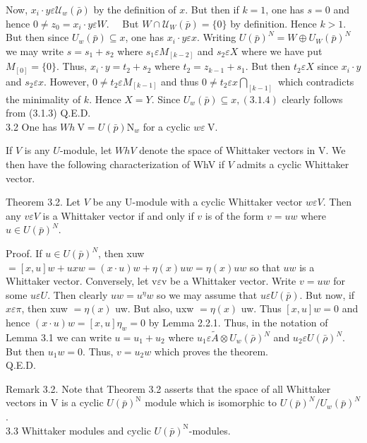 \documentclass[10pt]{article}
\begin{document}
Now, $x_{i} \cdot y \varepsilon \mathcal{U}_{w}(\bar{\rho})$ by the definition of $x$. But then if $k=1$, one has $s=0$ and hence $0 \neq z_{0}=x_{i} \cdot y \varepsilon W . \quad$ But $W \cap \mathcal{U}_{W}(\bar{p})=\{0\}$ by definition. Hence $k>1$. But then since $U_{w}(\bar{p}) \subseteq x$, one has $x_{i} \cdot y \varepsilon x$. Writing $U(\bar{p})^{N}=W \oplus U_{W}(\bar{p})^{N}$ we may write $s=s_{1}+s_{2}$ where $s_{1} \varepsilon M_{[k-2]}$ and $s_{2} \varepsilon X$ where we have put $M_{[0]}=\{0\}$. Thus, $x_{i} \cdot y=t_{2}+s_{2}$ where $t_{2}=z_{k-1}+s_{1}$. But then $t_{2} \varepsilon X$ since $x_{i} \cdot y$ and $s_{2} \varepsilon x$. However, $0 \neq t_{2} \varepsilon M_{[k-1]}$ and thus $0 \neq t_{2} \varepsilon x \bigcap_{[k-1]}$ which contradicts the minimality of $k$. Hence $X=Y$. Since $U_{w}(\bar{p}) \subseteq x,(3.1 .4)$ clearly follows from (3.1.3) Q.E.D.\\
3.2 One has $W h \mathrm{~V}=U(\bar{p}) \mathrm{N}_{w}$ for a cyclic $w \varepsilon \mathrm{~V}$.

If $V$ is any $U$-module, let $W h V$ denote the space of Whittaker vectors in V. We then have the following characterization of WhV if $V$ admits a cyclic Whittaker vector.

Theorem 3.2. Let $V$ be any U-module with a cyclic Whittaker vector $w \varepsilon V$. Then any $v \varepsilon V$ is a Whittaker vector if and only if $v$ is of the form $v=u w$ where $u \in U(\bar{p})^{N}$.

Proof. If $u \in U(\bar{p})^{N}$, then xuw $=[x, u] w+u x w= (x \cdot u) w+\eta(x) u w=\eta(x) u w$ so that $u w$ is a Whittaker vector. Conversely, let $\mathrm{v} \varepsilon \mathrm{v}$ be a Whittaker vector. Write $v=u w$ for some $u \varepsilon U$. Then clearly $u w=u^{\eta} w$ so we may assume that $u \varepsilon U(\bar{p})$. But now, if $x \varepsilon \pi$, then xuw $=\eta(x)$ uw. But also, uxw $=\eta(x)$ uw. Thus $[x, u] w=0$ and hence $(x \cdot u) w=[x, u] \eta_{w}=0$ by Lemma 2.2.1. Thus, in the notation of Lemma 3.1 we can write $u=u_{1}+u_{2}$ where $u_{1} \varepsilon \tilde{A} \otimes U_{w}(\bar{\rho})^{N}$ and $u_{2} \varepsilon U(\bar{\rho})^{N}$. But then $u_{1} w=0$. Thus, $v=u_{2} w$ which proves the theorem.\\
Q.E.D.

Remark 3.2. Note that Theorem 3.2 asserts that the space of all Whittaker vectors in V is a cyclic $U(\bar{p})^{\mathrm{N}}$ module which is isomorphic to $U(\bar{p})^{N} / U_{w}(\bar{p})^{N}$.\\
3.3 Whittaker modules and cyclic $U(\bar{p})^{\mathrm{N}}$-modules.
\end{document}
